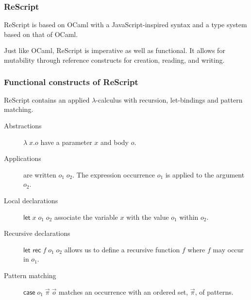 \documentclass[aspectratio=169]{beamer}
\begin{document}
\begin{frame}
  \frametitle{ReScript}

  ReScript is based on OCaml with a JavaScript-inspired syntax and a
  type system based on that of OCaml. 


  Just like OCaml, ReScript is imperative as well as functional. It
  allows for mutability through reference constructs for creation,
  reading, and writing.
  
\end{frame}




\begin{frame}
  \frametitle{Functional constructs of ReScript}

  ReScript contains an applied $\lambda$-calculus with recursion,
  let-bindings and pattern matching.
  
 \begin{description}
  \item[Abstractions] $\lambda\;x.o$ have a parameter $x$ and
body $o$.  

\item[Applications] are written $o_1\;o_2$. The expression occurrence
  $o_1$ is applied to the argument $o_2$.

\item[Local declarations] $\textsf{let} \; x \; o_1 \; o_2$ associate
the variable $x$ with the value $o_1$ within $o_2$.

\item[Recursive declarations]
$\textsf{let rec} \; f \; o_1 \; o_2$ allows us to define a recursive
function $f$ where $f$ may occur in $o_1$.

\item[Pattern matching] $\textsf{case} \; o_1 \; \vec{\pi} \; \vec{o}$
  matches an occurrence with an ordered set, $\vec{\pi}$, of
  patterns. 
\end{description}

\end{frame}
\end{document}

